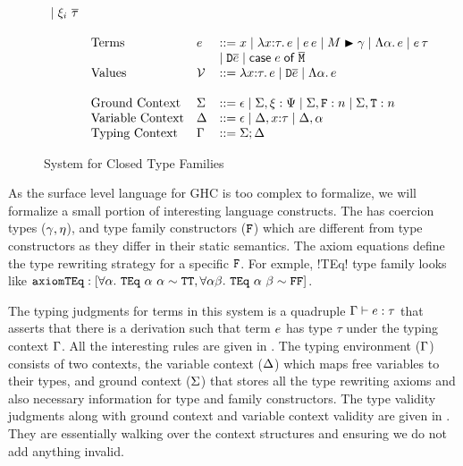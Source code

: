 \documentclass[format=sigplan,manuscript,review,screen,nonacm,margin=1in]{acmart}
\begin{document}
\begin{figure}[ht]
\[\begin{array}{l l l l l}
                                        \mathrel{\mid} \xi_{i}~{\overline{\tau}} & \\
      \\
      &\text{Terms}      & e        &\mathrel{{:}{:}{=}} x \mathrel{\mid} \lambda x{:}\tau.\, e \mathrel{\mid} e\,e \mathrel{\mid}M\mathrel{\blacktriangleright}\gamma 
                                        \mathrel{\mid} \Lambda \alpha.\, e \mathrel{\mid} e\,\tau  \\
      &                  &            & \mathrel{\mid} \texttt{D}\overline{e} \mathrel{\mid} \mathsf{case}\;e\;\mathsf{of}\;\overline{\texttt{M}} \\
      &\text{Values}     &\mathcal{V}        &\mathrel{{:}{:}{=}} \lambda x{:}\tau.\, e \mathrel{\mid} \texttt{D}\overline{e} \mathrel{\mid} \Lambda \alpha.\, e\\
      \\
      &\text{Ground Context} &\Sigma   &\mathrel{{:}{:}{=}} \epsilon \mathrel{\mid} \Sigma,\xi:\Psi
                                        \mathrel{\mid} \Sigma,\texttt{F}:n \mathrel{\mid} \Sigma,\texttt{T}:n\\
      &\text{Variable Context}&\Delta  &\mathrel{{:}{:}{=}} \epsilon \mathrel{\mid} \Delta,x{:}\tau \mathrel{\mid} \Delta,\alpha\\
      &\text{Typing Context}  &\Gamma  &\mathrel{{:}{:}{=}} \Sigma;\Delta\\
    \end{array}
  \]
  \caption[\CLTF{}]{System for Closed Type Families}
  \label{fig:syntax-tf-closed}
\end{figure}
As the surface level language for GHC is too complex to formalize, we will formalize a small portion
of interesting language constructs. The \CLTF has coercion types ($\gamma,\eta$), and 
type family constructors ($\texttt{F}$) which are different from type constructors as they differ in their
static semantics. The axiom equations define the type rewriting strategy for a specific $\texttt{F}$.
For exmple, !TEq! type family looks like $\texttt{axiomTEq}: [\forall\alpha.~{\texttt{TEq}~\alpha~\alpha} \mathrel{\sim} \texttt{TT}
, \forall\alpha\beta.~{\texttt{TEq}~\alpha~\beta} \mathrel{\sim} \texttt{FF}]$.

The typing judgments for terms in this system is a quadruple $\Gamma \vdash e : \tau$ that asserts that
there is a derivation such that term $e$ has type $\tau$ under the typing context $\Gamma$. All the interesting
rules are given in . The typing environment ($\Gamma$) consists of two contexts,
the variable context ($\Delta$) which maps free variables to their types, and ground context ($\Sigma$)
that stores all the type rewriting axioms and also necessary information for type and family constructors.
The type validity judgments along with ground context and variable context validity are given in .
They are essentially walking over the context structures and ensuring we do not add anything invalid.
\end{document}
